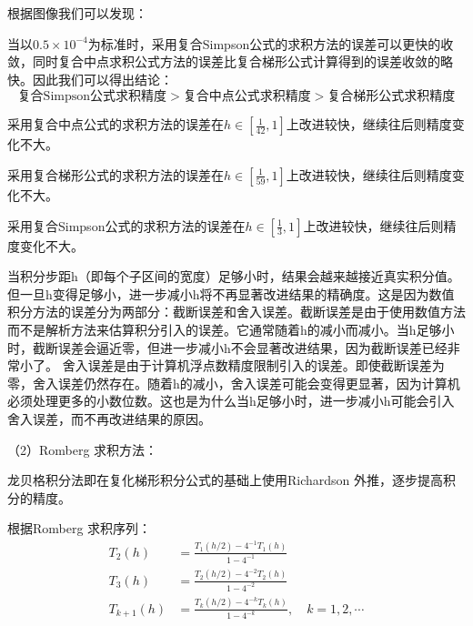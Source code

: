 \documentclass{homework}
\begin{document}
  根据图像我们可以发现：

  当以$0.5\times10^{-4}$为标准时，采用复合Simpson公式的求积方法的误差可以更快的收敛，同时复合中点求积公式方法的误差比复合梯形公式计算得到的误差收敛的略快。因此我们可以得出结论：
  \begin{equation}
    \mbox{复合Simpson公式求积精度}>\mbox{复合中点公式求积精度}>\mbox{复合梯形公式求积精度}
  \end{equation}
  
  采用复合中点公式的求积方法的误差在$h\in\left[\frac{1}{42},1\right]$上改进较快，继续往后则精度变化不大。

  采用复合梯形公式的求积方法的误差在$h\in\left[\frac{1}{59},1\right]$上改进较快，继续往后则精度变化不大。

  采用复合Simpson公式的求积方法的误差在$h\in\left[\frac{1}{3},1\right]$上改进较快，继续往后则精度变化不大。

  当积分步距h（即每个子区间的宽度）足够小时，结果会越来越接近真实积分值。但一旦h变得足够小，进一步减小h将不再显著改进结果的精确度。这是因为数值积分方法的误差分为两部分：截断误差和舍入误差。截断误差是由于使用数值方法而不是解析方法来估算积分引入的误差。它通常随着h的减小而减小。当h足够小时，截断误差会逼近零，但进一步减小h不会显著改进结果，因为截断误差已经非常小了。
  舍入误差是由于计算机浮点数精度限制引入的误差。即使截断误差为零，舍入误差仍然存在。随着h的减小，舍入误差可能会变得更显著，因为计算机必须处理更多的小数位数。这也是为什么当h足够小时，进一步减小h可能会引入舍入误差，而不再改进结果的原因。
\vspace{2em}

  （2）Romberg 求积方法：

  龙贝格积分法即在复化梯形积分公式的基础上使用Richardson 外推，逐步提高积分的精度。
  
  根据Romberg 求积序列：
  \begin{equation}
    \begin{aligned}
        T_2(h)&=\frac{T_1(h/2)-4^{-1}T_1(h)}{1-4^{-1}}\\
        T_3(h)&=\frac{T_2(h/2)-4^{-2}T_2(h)}{1-4^{-2}}\\
        T_{k+1}(h)&=\frac{T_k(h/2)-4^{-k}T_k(h)}{1-4^{-k}},\quad k=1,2,\cdots\\
    \end{aligned}
  \end{equation}
\end{document}
